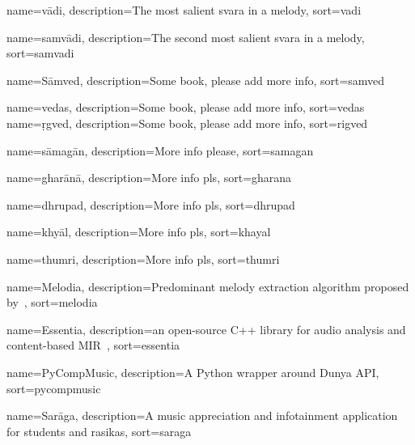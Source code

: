 
	
	
{
	name={v\={a}di},
	description={The most salient svara in a melody},
	sort=vadi
}

{
	name={samv\={a}di},
	description={The second most salient svara in a melody},
	sort=samvadi
}

{
	name={S\={a}mved},
	description={Some book, please add more info},
	sort=samved
}

{
	name={vedas},
	description={Some book, please add more info},
	sort=vedas
}
{
	name={\d{r}gved},
	description={Some book, please add more info},
	sort=rigved
}

{
	name={s\={a}mag\={a}n},
	description={More info please},
	sort=samagan
}

{
	name={ghar\={a}n\={a}},
	description={More info pls},
	sort=gharana
}

{
	name={dhrupad},
	description={More info pls},
	sort=dhrupad
}

{
	name={khy\={a}l},
	description={More info pls},
	sort=khayal
}

{
	name={thumri},
	description={More info pls},
	sort=thumri
}

{
	name={Melodia},
	description={Predominant melody extraction algorithm proposed by~\cite{Salamon2012}},
	sort=melodia
}

{
	name={Essentia},
	description={an open-source C++ library for audio analysis and content-based MIR~\citep{essentia}},
	sort=essentia
}

{
	name={PyCompMusic},
	description={A Python wrapper around Dunya API},
	sort=pycompmusic
}

{
	name={Sar\={a}ga},
	description={A music appreciation and infotainment application for students and rasikas},
	sort=saraga
}

